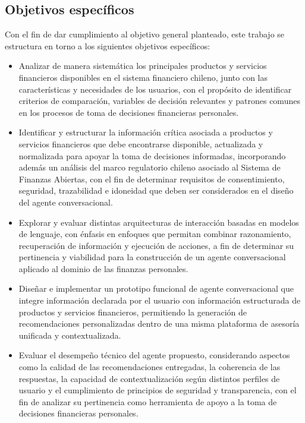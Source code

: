 \documentclass[
	spanish, %
	letterpaper, oneside
]{book}
\begin{document}
\subsection{Objetivos específicos}

Con el fin de dar cumplimiento al objetivo general planteado, este trabajo se estructura en torno a los siguientes objetivos específicos:

\begin{itemize}
    \item Analizar de manera sistemática los principales productos y servicios financieros disponibles en el sistema financiero chileno, junto con las características y necesidades de los usuarios, con el propósito de identificar criterios de comparación, variables de decisión relevantes y patrones comunes en los procesos de toma de decisiones financieras personales.

    \item Identificar y estructurar la información crítica asociada a productos y servicios financieros que debe encontrarse disponible, actualizada y normalizada para apoyar la toma de decisiones informadas, incorporando además un análisis del marco regulatorio chileno asociado al Sistema de Finanzas Abiertas, con el fin de determinar requisitos de consentimiento, seguridad, trazabilidad e idoneidad que deben ser considerados en el diseño del agente conversacional.

    \item Explorar y evaluar distintas arquitecturas de interacción basadas en modelos de lenguaje, con énfasis en enfoques que permitan combinar razonamiento, recuperación de información y ejecución de acciones, a fin de determinar su pertinencia y viabilidad para la construcción de un agente conversacional aplicado al dominio de las finanzas personales.

    \item Diseñar e implementar un prototipo funcional de agente conversacional que integre información declarada por el usuario con información estructurada de productos y servicios financieros, permitiendo la generación de recomendaciones personalizadas dentro de una misma plataforma de asesoría unificada y contextualizada.

    \item Evaluar el desempeño técnico del agente propuesto, considerando aspectos como la calidad de las recomendaciones entregadas, la coherencia de las respuestas, la capacidad de contextualización según distintos perfiles de usuario y el cumplimiento de principios de seguridad y transparencia, con el fin de analizar su pertinencia como herramienta de apoyo a la toma de decisiones financieras personales.
\end{itemize}
\end{document}
